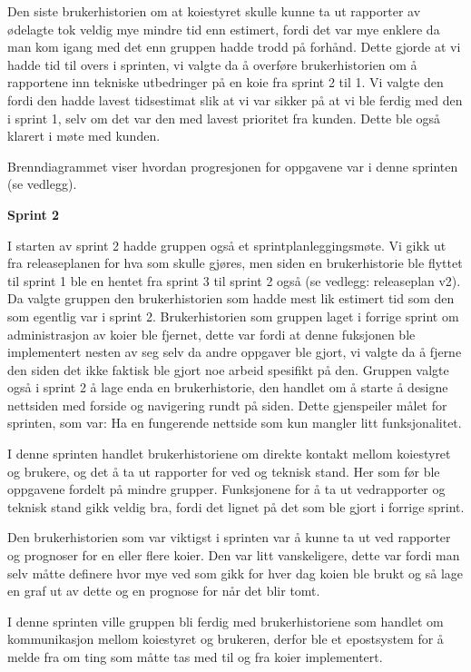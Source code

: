 \documentclass[12pt,a4paper,norsk]{article}
\begin{document}
Den siste brukerhistorien om at koiestyret skulle kunne ta ut rapporter av ødelagte tok veldig mye mindre tid enn estimert, fordi det var mye enklere da man kom igang med det enn gruppen hadde trodd på forhånd. Dette gjorde at vi hadde tid til overs i sprinten, vi valgte da å overføre brukerhistorien om å rapportene inn tekniske utbedringer på en koie fra sprint 2 til 1.  Vi valgte den fordi den hadde lavest tidsestimat slik at vi var sikker på at vi ble ferdig med den i sprint 1, selv om det var den med lavest prioritet fra kunden. Dette ble også klarert i møte med kunden. 

Brenndiagrammet viser hvordan progresjonen for oppgavene var i denne sprinten (se vedlegg).

\bigskip \noindent \textbf{Sprint 2}
\par I starten av sprint 2 hadde gruppen også et sprintplanleggingsmøte. Vi gikk ut fra releaseplanen for hva som skulle gjøres, men siden en brukerhistorie ble flyttet til sprint 1 ble en hentet fra sprint 3 til sprint 2 også (se vedlegg: releaseplan v2). Da valgte gruppen den brukerhistorien som hadde mest lik estimert tid som den som egentlig var i sprint 2. Brukerhistorien som gruppen laget i forrige sprint om administrasjon av koier ble fjernet, dette var fordi at denne fuksjonen ble implementert nesten av seg selv da andre oppgaver ble gjort, vi valgte da å fjerne den siden det ikke faktisk ble gjort noe arbeid spesifikt på den. Gruppen valgte også i sprint 2 å lage enda en brukerhistorie, den handlet om å starte å designe nettsiden med forside og navigering rundt på siden. Dette gjenspeiler målet for sprinten, som var: Ha en fungerende nettside som kun mangler litt funksjonalitet.

I denne sprinten handlet brukerhistoriene om direkte kontakt mellom koiestyret og brukere, og det å ta ut rapporter for ved og teknisk stand. Her som før ble oppgavene fordelt på mindre grupper. Funksjonene for å ta ut vedrapporter og teknisk stand gikk veldig bra, fordi det lignet på det som ble gjort i forrige sprint.

Den brukerhistorien som var viktigst i sprinten var å kunne ta ut ved rapporter og prognoser for en eller flere koier. Den var litt vanskeligere, dette var fordi man selv måtte definere hvor mye ved som gikk for hver dag koien ble brukt og så lage en graf ut av dette og en prognose for når det blir tomt. 

I denne sprinten ville gruppen bli ferdig med brukerhistoriene som handlet om kommunikasjon mellom koiestyret og brukeren, derfor ble et epostsystem for å melde fra om ting som måtte tas med til og fra koier implementert. 
\end{document}
